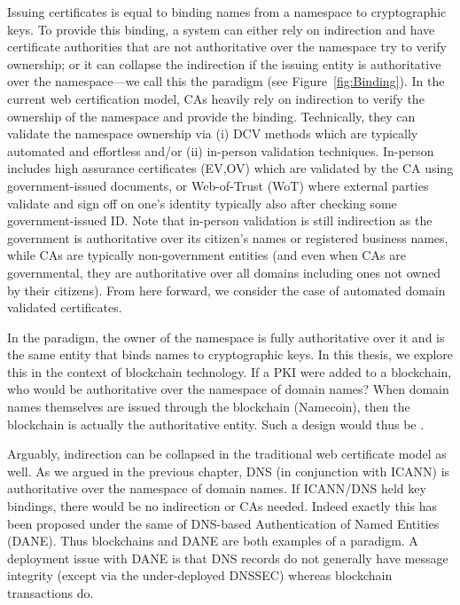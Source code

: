 Issuing certificates is equal to binding names from a namespace to cryptographic keys. To provide this binding, a system can either rely on indirection and have certificate authorities that are not authoritative over the namespace try to verify ownership; or it can collapse the indirection if the issuing entity is authoritative over the namespace---we call this the \UA paradigm (see Figure~\ref{fig:Binding}). In the current web certification model, CAs heavily rely on indirection to verify the ownership of the namespace and provide the binding. Technically, they can validate the namespace ownership via (i) DCV methods which are typically automated and effortless and/or (ii) in-person validation techniques. In-person includes high assurance certificates (EV,OV) which are validated by the CA using government-issued documents, or Web-of-Trust (WoT) where external parties validate and sign off on one's identity typically also after checking some government-issued ID. Note that in-person validation is still indirection as the government is authoritative over its citizen's names or registered business names, while CAs are typically non-government entities (and even when CAs are governmental, they are authoritative over all domains including ones not owned by their citizens). From here forward, we consider the case of automated domain validated certificates. 

In the \UA paradigm, the owner of the namespace is fully authoritative over it and is the same entity that binds names to cryptographic keys. In this thesis, we explore this in the context of blockchain technology. If a PKI were added to a blockchain, who would be authoritative over the namespace of domain names? When domain names themselves are issued through the blockchain (\eg Namecoin), then the blockchain is actually the authoritative entity. Such a design would thus be \UA. 

Arguably, indirection can be collapsed in the traditional web certificate model as well. As we argued in the previous chapter, DNS (in conjunction with ICANN) is authoritative over the namespace of domain names. If ICANN/DNS held key bindings, there would be no indirection or CAs needed. Indeed exactly this has been proposed under the same of DNS-based Authentication of Named Entities (DANE). Thus blockchains and DANE are both examples of a \UA paradigm. A deployment issue with DANE is that DNS records do not generally have message integrity (except via the under-deployed DNSSEC) whereas blockchain transactions do. 

